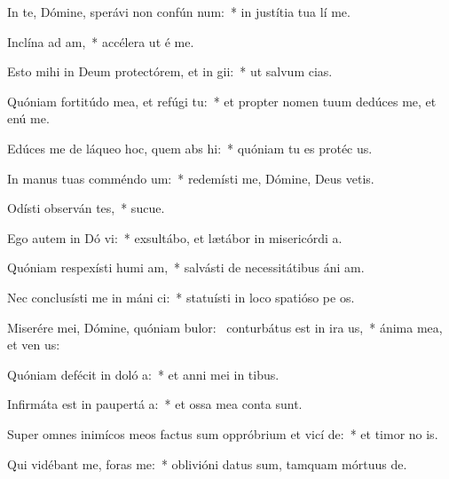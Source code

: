 \item In te, Dómine, sperávi non confún  num:~* in justítia tua lí me.
\item Inclína ad   am,~* accélera ut é me.
\item Esto mihi in Deum protectórem, et in  gii:~* ut salvum  cias.
\item Quóniam fortitúdo mea, et refúgi   tu:~* et propter nomen tuum dedúces me, et enú me.
\item Edúces me de láqueo hoc, quem abs hi:~* quóniam tu es protéc us.
\item In manus tuas comméndo  um:~* redemísti me, Dómine, Deus vetis.
\item Odísti observán tes,~* sucue.
\item Ego autem in Dó vi:~* exsultábo, et lætábor in misericórdi a.
\item Quóniam respexísti humi am,~* salvásti de necessitátibus áni am.
\item Nec conclusísti me in máni ci:~* statuísti in loco spatióso pe os.
\item Miserére mei, Dómine, quóniam bulor:~\pscross{} conturbátus est in ira  us,~* ánima mea, et ven us:
\item Quóniam defécit in doló  a:~* et anni mei in tibus.
\item Infirmáta est in paupertá  a:~* et ossa mea conta sunt.
\item Super omnes inimícos meos factus sum oppróbrium et vicí  de:~* et timor no is.
\item Qui vidébant me, foras   me:~* oblivióni datus sum, tamquam mórtuus  de.
